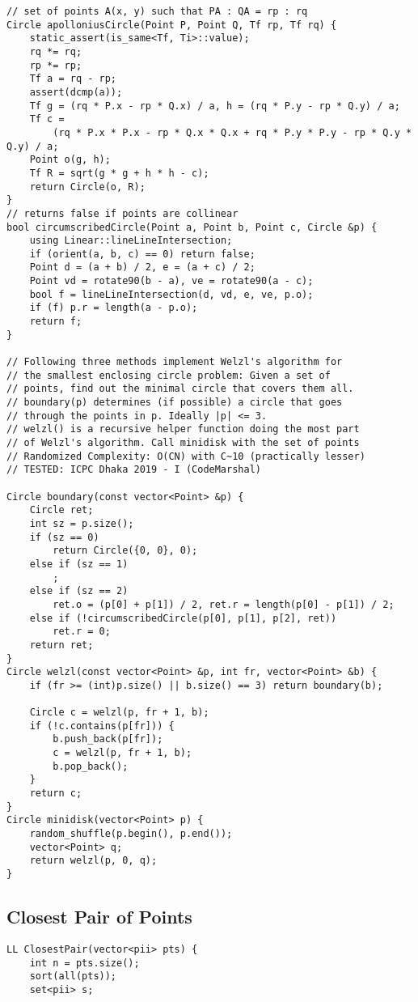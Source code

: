 \documentclass[10pt,a4paper,onesided]{article}
\begin{document}
\begin{multicols*}{3}
\begin{lstlisting}
// set of points A(x, y) such that PA : QA = rp : rq
Circle apolloniusCircle(Point P, Point Q, Tf rp, Tf rq) {
    static_assert(is_same<Tf, Ti>::value);
    rq *= rq;
    rp *= rp;
    Tf a = rq - rp;
    assert(dcmp(a));
    Tf g = (rq * P.x - rp * Q.x) / a, h = (rq * P.y - rp * Q.y) / a;
    Tf c =
        (rq * P.x * P.x - rp * Q.x * Q.x + rq * P.y * P.y - rp * Q.y * Q.y) / a;
    Point o(g, h);
    Tf R = sqrt(g * g + h * h - c);
    return Circle(o, R);
}
// returns false if points are collinear
bool circumscribedCircle(Point a, Point b, Point c, Circle &p) {
    using Linear::lineLineIntersection;
    if (orient(a, b, c) == 0) return false;
    Point d = (a + b) / 2, e = (a + c) / 2;
    Point vd = rotate90(b - a), ve = rotate90(a - c);
    bool f = lineLineIntersection(d, vd, e, ve, p.o);
    if (f) p.r = length(a - p.o);
    return f;
}

// Following three methods implement Welzl's algorithm for
// the smallest enclosing circle problem: Given a set of
// points, find out the minimal circle that covers them all.
// boundary(p) determines (if possible) a circle that goes
// through the points in p. Ideally |p| <= 3.
// welzl() is a recursive helper function doing the most part
// of Welzl's algorithm. Call minidisk with the set of points
// Randomized Complexity: O(CN) with C~10 (practically lesser)
// TESTED: ICPC Dhaka 2019 - I (CodeMarshal)

Circle boundary(const vector<Point> &p) {
    Circle ret;
    int sz = p.size();
    if (sz == 0)
        return Circle({0, 0}, 0);
    else if (sz == 1)
        ;
    else if (sz == 2)
        ret.o = (p[0] + p[1]) / 2, ret.r = length(p[0] - p[1]) / 2;
    else if (!circumscribedCircle(p[0], p[1], p[2], ret))
        ret.r = 0;
    return ret;
}
Circle welzl(const vector<Point> &p, int fr, vector<Point> &b) {
    if (fr >= (int)p.size() || b.size() == 3) return boundary(b);

    Circle c = welzl(p, fr + 1, b);
    if (!c.contains(p[fr])) {
        b.push_back(p[fr]);
        c = welzl(p, fr + 1, b);
        b.pop_back();
    }
    return c;
}
Circle minidisk(vector<Point> p) {
    random_shuffle(p.begin(), p.end());
    vector<Point> q;
    return welzl(p, 0, q);
}
\end{lstlisting}
\subsection{Closest Pair of Points}
\begin{lstlisting}
LL ClosestPair(vector<pii> pts) {
    int n = pts.size();
    sort(all(pts));
    set<pii> s;


\end{lstlisting}
\end{multicols*}
\end{document}
